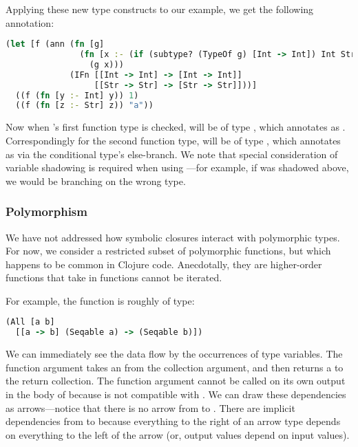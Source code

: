 Applying these new type constructs to our example, we get the following annotation:

\begin{lstlisting}[language=Clojure]
(let [f (ann (fn [g]
               (fn [x :- (if (subtype? (TypeOf g) [Int -> Int]) Int Str)]
                 (g x)))
             (IFn [[Int -> Int] -> [Int -> Int]]
                  [[Str -> Str] -> [Str -> Str]]))]
  ((f (fn [y :- Int] y)) 1)
  ((f (fn [z :- Str] z)) "a"))
\end{lstlisting}

Now when 's first function type is checked,
 will be of type , which annotates
 as .
Correspondingly for the second function type,
 will be of type , which annotates
 as  via the conditional type's else-branch.
We note that special consideration of variable shadowing is required when using ---for
example, if  was shadowed above, we would be branching on the wrong type.

\subsubsection{Polymorphism}

We have not addressed how symbolic closures interact with polymorphic types.
For now, we consider a restricted subset of polymorphic functions, but which happens to be
common in Clojure code.
Anecdotally, they are higher-order functions that take in functions cannot be iterated.

For example, the  function is roughly of type:

\begin{lstlisting}[language=Clojure]
(All [a b]
  [[a -> b] (Seqable a) -> (Seqable b)])
\end{lstlisting}

We can immediately see the data flow by the occurrences of type variables.
The function argument takes an  from the collection argument,
and then returns a  to the return collection.
The function argument cannot be called on its own output in the body
of  because  is not compatible with .
We can draw these dependencies as arrows---notice that there is no arrow
from  to . There are implicit dependencies from
 to  because everything to the right of an arrow type depends
on everything to the left of the arrow (or, output values depend
on input values).


